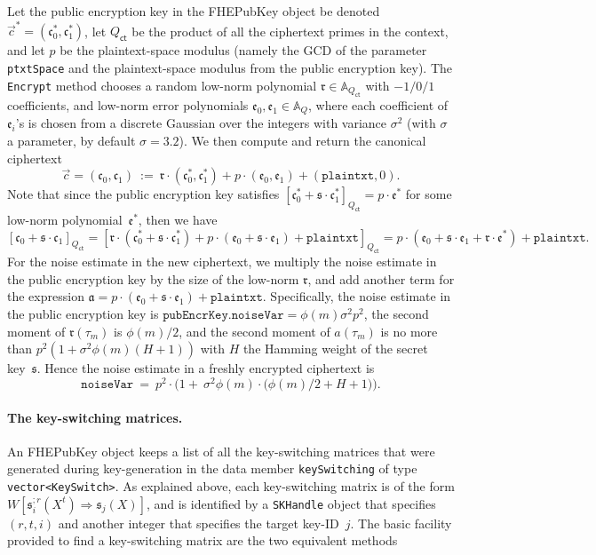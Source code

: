 \documentclass[14pt]{extarticle}
\newcommand{\A}{\mathbb{A}}
\def\Qct{Q_\mathsf{ct}}
\def\FHEPubKey{\textsf{FHEPubKey}}
\def\vc{\vec{c}}
\newcommand{\mfa}{\mathfrak{a}}
\newcommand{\ee}{\mathfrak{e}}
\newcommand{\ct}{\mathfrak{c}}
\newcommand{\rr}{\mathfrak{r}}
\newcommand{\sk}{\mathfrak{s}}
\begin{document}
Let the public encryption key in the {\FHEPubKey} object be denoted
$\vc^*=(\ct_0^*,\ct_1^*)$, let $\Qct$ be the product of all the
ciphertext primes in the context, and let $p$ be the plaintext-space
modulus (namely the GCD of the parameter \texttt{ptxtSpace} and the
plaintext-space modulus from the public encryption key). The
\texttt{Encrypt} method chooses a random low-norm polynomial $\rr\in
\A_{\Qct}$ with $-1/0/1$ coefficients, and low-norm error polynomials
$\ee_0,\ee_1\in\A_Q$, where each coefficient of $\ee_i$'s is chosen
from a discrete Gaussian over the integers with variance $\sigma^2$
(with $\sigma$ a parameter, by default $\sigma=3.2$). We then compute
and return the canonical ciphertext
\[
\vc = (\ct_0,\ct_1) ~:=~ \rr \cdot(\ct_0^*,\ct_1^*) + p\cdot(\ee_0,\ee_1)
+ (\mathtt{plaintxt},0).
\]
Note that since the public encryption key satisfies $[\ct_0^*+\sk\cdot
\ct_1^*]_{\Qct}=p\cdot\ee^*$ for some low-norm polynomial~$\ee^*$,
then we have
\[
[\ct_0+\sk\cdot\ct_1]_{\Qct} 
= \left[\rr\cdot(\ct_0^*+\sk\cdot\ct_1^*)+p\cdot(\ee_0+\sk\cdot\ee_1)
        + \mathtt{plaintxt}\right]_{\Qct}
= p\cdot(\ee_0+\sk\cdot\ee_1+\rr\cdot\ee^*) + \mathtt{plaintxt}.
\]
For the noise estimate in the new ciphertext, we multiply the noise
estimate in the public encryption key by the size of the low-norm
$\rr$, and add another term for the expression $\mfa=p\cdot(\ee_0+
\sk\cdot\ee_1)+\mathtt{plaintxt}$. Specifically, the noise estimate
in the public encryption key is $\mathtt{pubEncrKey.noiseVar}=\phi(m)
\sigma^2 p^2$, the second moment of $\rr(\tau_m)$ is $\phi(m)/2$, and
the second moment of $a(\tau_m)$ is no more than $p^2(1+\sigma^2{\phi(m)}
(H+1))$ with $H$ the Hamming weight of the secret key~$\sk$. Hence the
noise estimate in a freshly encrypted ciphertext is
\[
\mathtt{noiseVar}
~=~ p^2\cdot\big(1+~\sigma^2\phi(m)\cdot\big(\phi(m)/2 + H + 1\big)\big).
\]

\paragraph{The key-switching matrices.} An {\FHEPubKey} object keeps
a list of all the key-switching matrices that were generated during
key-generation in the data member \texttt{keySwitching} of type
\texttt{vector<KeySwitch>}. As explained above, each key-switching
matrix is of the form $W[\sk_i^{;r}(X^t)\Rightarrow\sk_j(X)]$, and
is identified by a \texttt{SKHandle} object that specifies $(r,t,i)$
and another integer that specifies the target key-ID~$j$. The basic
facility provided to find a key-switching matrix are the two
equivalent methods
\end{document}
